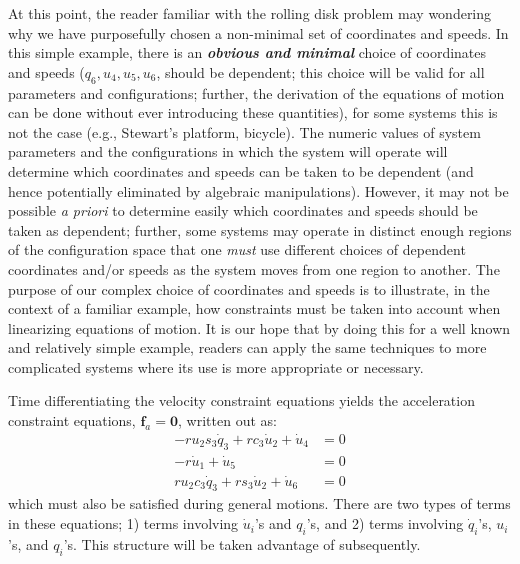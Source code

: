 \documentclass[smallcondensed,final]{svjour3}                     %
\begin{document}
At this point, the reader familiar with the rolling disk problem may wondering
why we have purposefully chosen a non-minimal set of coordinates and speeds.
In this simple example, there is an {\bf \textit{obvious and minimal}} choice
of coordinates and speeds ($q_6, u_4, u_5, u_6$, should be dependent; this
choice will be valid for all parameters and configurations; further, the
derivation of the equations of motion can be done without ever introducing
these quantities), for some systems this is not the case (e.g., Stewart's
platform, bicycle). The numeric values of system parameters and the
configurations in which the system will operate will determine which
coordinates and speeds can be taken to be dependent (and hence potentially
eliminated by algebraic manipulations).  However, it may not be possible
\textit{a priori} to determine easily which coordinates and speeds should be
taken as dependent; further, some systems may operate in distinct enough
regions of the configuration space that one \textit{must} use different choices
of dependent coordinates and/or speeds as the system moves from one region to
another. The purpose of our complex choice of coordinates and speeds is to
illustrate, in the context of a familiar example, how constraints must be taken
into account when linearizing equations of motion. It is our hope that by doing
this for a well known and relatively simple example, readers can apply the same
techniques to more complicated systems where its use is more appropriate or
necessary.

Time differentiating the velocity constraint equations yields the acceleration
constraint equations, $\mathbf{f}_a = \mathbf{0}$, written out as:
\begin{subequations}
\label{rd:f_a}
\begin{align}
    -r u_{2} s_3 \dot{q}_{3} + r c_3 \dot{u}_{2} + \dot{u}_{4} &=
    0\\
    - r \dot{u}_{1} + \dot{u}_{5} &= 0\\
    r u_{2} c_3 \dot{q}_{3} + r s_3 \dot{u}_{2} + \dot{u}_{6} &=
    0
\end{align}
\end{subequations}
which must also be satisfied during general motions. There are two types of
terms in these equations; 1) terms involving $\dot{u}_i$'s and $q_i$'s, and 2)
terms involving $\dot{q}_i$'s, $u_i$'s, and $q_i$'s. This structure will be
taken advantage of subsequently.
\end{document}
